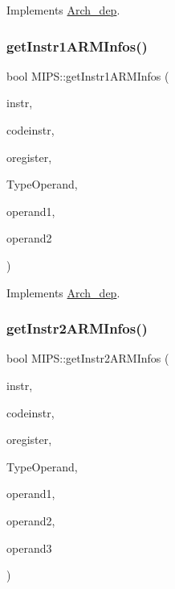 Implements \hyperlink{classArch__dep_ad09e79609dda858cdbd651064623ae2b}{Arch\+\_\+dep}.

\mbox{\label{classMIPS_add97e24f0dff226385044368b82cb6f1}} 
\subsubsection{\texorpdfstring{get\+Instr1\+A\+R\+M\+Infos()}{getInstr1ARMInfos()}}
{\footnotesize\ttfamily bool M\+I\+P\+S\+::get\+Instr1\+A\+R\+M\+Infos (\begin{DoxyParamCaption}\item[{string \&}]{instr,  }\item[{string \&}]{codeinstr,  }\item[{string \&}]{oregister,  }\item[{\hyperlink{arch_8h_a63b66e201ffc27bbc8f89c8808382044}{offset\+Type} $\ast$}]{Type\+Operand,  }\item[{string \&}]{operand1,  }\item[{string \&}]{operand2 }\end{DoxyParamCaption})\hspace{0.3cm}{\ttfamily [virtual]}}



Implements \hyperlink{classArch__dep_a30cdbcdc129741df876bda79fd76e9fe}{Arch\+\_\+dep}.

\mbox{\label{classMIPS_aefb9849f91cfe9bcb6baa71bcf0b4aa8}} 
\subsubsection{\texorpdfstring{get\+Instr2\+A\+R\+M\+Infos()}{getInstr2ARMInfos()}}
{\footnotesize\ttfamily bool M\+I\+P\+S\+::get\+Instr2\+A\+R\+M\+Infos (\begin{DoxyParamCaption}\item[{string \&}]{instr,  }\item[{string \&}]{codeinstr,  }\item[{string \&}]{oregister,  }\item[{\hyperlink{arch_8h_a63b66e201ffc27bbc8f89c8808382044}{offset\+Type} $\ast$}]{Type\+Operand,  }\item[{string \&}]{operand1,  }\item[{string \&}]{operand2,  }\item[{string \&}]{operand3 }\end{DoxyParamCaption})\hspace{0.3cm}{\ttfamily [virtual]}}



